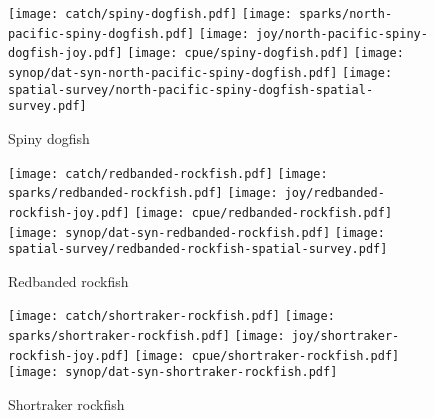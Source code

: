 \documentclass[12pt]{article}
\begin{document}
\begin{landscape}
\begin{figure}[htbp]
  \centering
    \texttt{[image: catch/spiny-dogfish.pdf]}
    \texttt{[image: sparks/north-pacific-spiny-dogfish.pdf]}
    \texttt{[image: joy/north-pacific-spiny-dogfish-joy.pdf]}
  \texttt{[image: cpue/spiny-dogfish.pdf]}
    \texttt{[image: synop/dat-syn-north-pacific-spiny-dogfish.pdf]}
  \texttt{[image: spatial-survey/north-pacific-spiny-dogfish-spatial-survey.pdf]}
    \caption{Spiny dogfish}
\end{figure}

\begin{figure}[htbp]
  \centering
  \texttt{[image: catch/redbanded-rockfish.pdf]}
  \texttt{[image: sparks/redbanded-rockfish.pdf]}
  \texttt{[image: joy/redbanded-rockfish-joy.pdf]}
  \texttt{[image: cpue/redbanded-rockfish.pdf]}
  \texttt{[image: synop/dat-syn-redbanded-rockfish.pdf]}
  \texttt{[image: spatial-survey/redbanded-rockfish-spatial-survey.pdf]}
  \caption{Redbanded rockfish}
\end{figure}

\begin{figure}[htbp]
  \centering
    \texttt{[image: catch/shortraker-rockfish.pdf]}
    \texttt{[image: sparks/shortraker-rockfish.pdf]}
    \texttt{[image: joy/shortraker-rockfish-joy.pdf]}
  \texttt{[image: cpue/shortraker-rockfish.pdf]}
    \texttt{[image: synop/dat-syn-shortraker-rockfish.pdf]}
  \caption{Shortraker rockfish}
\end{figure}

\clearpage 



\end{landscape}
\end{document}
